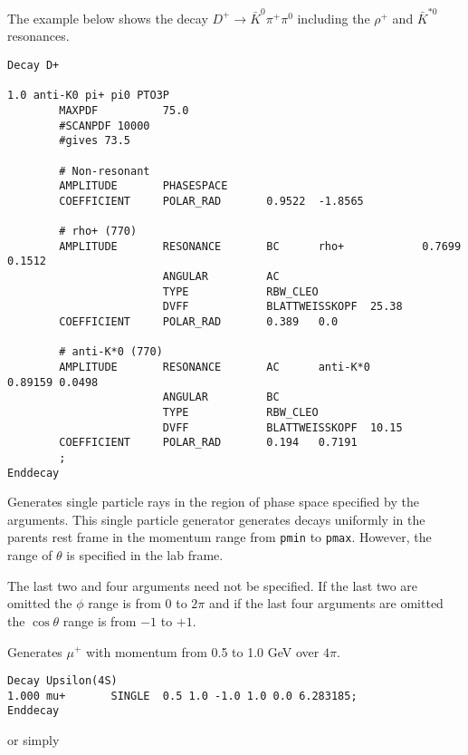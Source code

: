 \Example
The example below shows the decay $D^+\to \bar K^0\pi^+\pi^0$ including
the $\rho^+$ and $\bar K^{*0}$ resonances.

\begin{verbatim}
Decay D+

1.0 anti-K0 pi+ pi0 PTO3P       
        MAXPDF          75.0
        #SCANPDF 10000
        #gives 73.5

        # Non-resonant
        AMPLITUDE       PHASESPACE
        COEFFICIENT     POLAR_RAD       0.9522  -1.8565

        # rho+ (770) 
        AMPLITUDE       RESONANCE       BC      rho+            0.7699  0.1512
                        ANGULAR         AC
                        TYPE            RBW_CLEO
                        DVFF            BLATTWEISSKOPF  25.38
        COEFFICIENT     POLAR_RAD       0.389   0.0 

        # anti-K*0 (770) 
        AMPLITUDE       RESONANCE       AC      anti-K*0        0.89159 0.0498
                        ANGULAR         BC
                        TYPE            RBW_CLEO
                        DVFF            BLATTWEISSKOPF  10.15
        COEFFICIENT     POLAR_RAD       0.194   0.7191
        ;
Enddecay

\end{verbatim}





\label{single}



\Expl
Generates single particle rays in the region of phase space 
specified by the arguments. This single particle generator 
generates decays uniformly in the parents rest frame in 
the momentum range from {\tt pmin} to {\tt pmax}. However,
the range of $\theta$ is specified in the lab frame.

The last two and four arguments need not be specified. If
the last two are omitted the $\phi$ range is from $0$ to $2\pi$
and if the last four arguments are omitted the $\cos\theta$ range
is from $-1$ to $+1$.

\Example 
Generates $\mu^+$ with momentum from 0.5 to 1.0 GeV over $4\pi$.
\begin{verbatim}
Decay Upsilon(4S)
1.000 mu+       SINGLE  0.5 1.0 -1.0 1.0 0.0 6.283185;
Enddecay
\end{verbatim}

or simply

